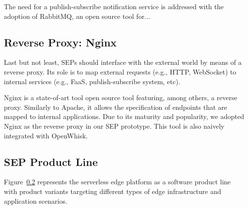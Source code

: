 The need for a publish-subscribe notification service is addressed with the adoption of RabbitMQ, an open source tool for...

\subsection{Reverse Proxy: Nginx}

Last but not least, SEPs should interface with the external world by means of a reverse proxy. Its role is to map external requests (e.g., HTTP, WebSocket) to internal services (e.g., FaaS, publish-subscribe system, etc). 

Nginx is a state-of-art tool open source tool featuring, among others, a reverse proxy. Similarly to Apache, it allows the specification of endpoints that are mapped to internal applications. Due to its maturity and popularity, we adopted Nginx as the reverse proxy in our SEP prototype. This tool is also naively integrated with OpenWhisk.

\subsection{SEP Product Line}

Figure~\ref{} represents the serverless edge platform as a software product line~\cite{} with product variants targeting different types of edge infrastructure and application scenarios.
